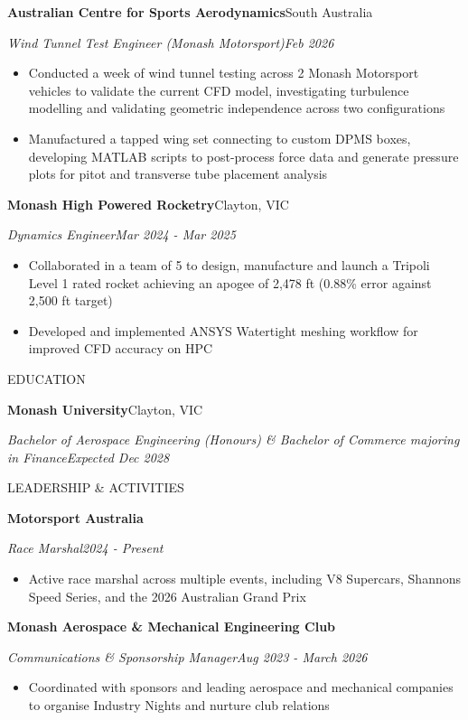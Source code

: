 \documentclass[10pt,a4paper]{article}
\newcommand{\cvsection}[1]{%
  \vspace{7pt}%
  {\large\color{accent}\uppercase{#1}}\par
  \vspace{2pt}{\color{accent}\hrule height 1.1pt}\vspace{3pt}}
\newcommand{\cvorg}[2]{\textbf{#1}\hfill #2\par}
\newcommand{\cvrole}[2]{\textit{#1}\hfill \textit{#2}\par}
\newenvironment{cvitems}{%
  \begin{itemize}[leftmargin=1.6em,labelsep=0.6em,itemsep=1pt,topsep=3pt,parsep=0pt,partopsep=0pt]}%
  {\end{itemize}\vspace{1pt}}
\begin{document}
\cvorg{Australian Centre for Sports Aerodynamics}{South Australia}
\cvrole{Wind Tunnel Test Engineer (Monash Motorsport)}{Feb 2026}
\begin{cvitems}
  \item Conducted a week of wind tunnel testing across 2 Monash Motorsport vehicles to validate the current CFD
        model, investigating turbulence modelling and validating geometric independence across two configurations
  \item Manufactured a tapped wing set connecting to custom DPMS boxes, developing MATLAB scripts to
        post-process force data and generate pressure plots for pitot and transverse tube placement analysis
\end{cvitems}

\cvorg{Monash High Powered Rocketry}{Clayton, VIC}
\cvrole{Dynamics Engineer}{Mar 2024 - Mar 2025}
\begin{cvitems}
  \item Collaborated in a team of 5 to design, manufacture and launch a Tripoli Level 1 rated rocket achieving an
        apogee of 2,478 ft (0.88\% error against 2,500 ft target)
  \item Developed and implemented ANSYS Watertight meshing workflow for improved CFD accuracy on HPC
\end{cvitems}

\cvsection{Education}

\cvorg{Monash University}{Clayton, VIC}
\cvrole{Bachelor of Aerospace Engineering (Honours) \& Bachelor of Commerce majoring in Finance}{Expected Dec 2028}

\cvsection{Leadership \& Activities}

\cvorg{Motorsport Australia}{}
\cvrole{Race Marshal}{2024 - Present}
\begin{cvitems}
  \item Active race marshal across multiple events, including V8 Supercars, Shannons Speed Series, and the 2026
        Australian Grand Prix
\end{cvitems}

\cvorg{Monash Aerospace \& Mechanical Engineering Club}{}
\cvrole{Communications \& Sponsorship Manager}{Aug 2023 - March 2026}
\begin{cvitems}
  \item Coordinated with sponsors and leading aerospace and mechanical companies to organise Industry Nights
        and nurture club relations
\end{cvitems}
\end{document}
